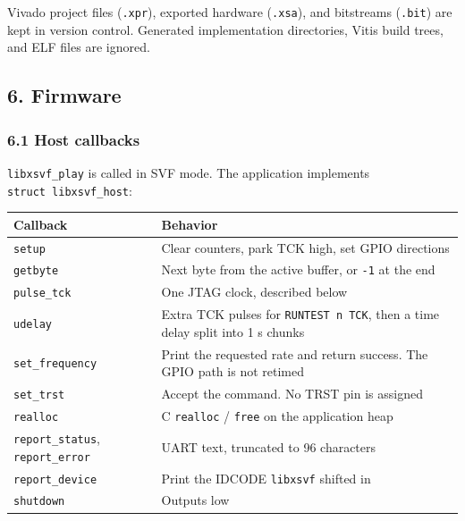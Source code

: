 \documentclass[
  11pt,
  a4paper,
]{article}
\newcounter{none} %
\begin{document}
Vivado project files (\texttt{.xpr}), exported hardware (\texttt{.xsa}),
and bitstreams (\texttt{.bit}) are kept in version control. Generated
implementation directories, Vitis build trees, and ELF files are
ignored.

\subsection{6. Firmware}\label{firmware}

\subsubsection{6.1 Host callbacks}\label{host-callbacks}

\texttt{libxsvf\_play} is called in SVF mode. The application implements
\texttt{struct\ libxsvf\_host}:

{\def\LTcaptype{none} %
\begin{longtable}[]{@{}
  >{\raggedright\arraybackslash}p{}
  >{\raggedright\arraybackslash}p{}@{}}
\toprule\noalign{}
\begin{minipage}[b]{\linewidth}\raggedright
Callback
\end{minipage} & \begin{minipage}[b]{\linewidth}\raggedright
Behavior
\end{minipage} \\
\midrule\noalign{}
\endhead
\bottomrule\noalign{}
\endlastfoot
\texttt{setup} & Clear counters, park TCK high, set GPIO directions \\
\texttt{getbyte} & Next byte from the active buffer, or \texttt{-1} at
the end \\
\texttt{pulse\_tck} & One JTAG clock, described below \\
\texttt{udelay} & Extra TCK pulses for \texttt{RUNTEST\ n\ TCK}, then a
time delay split into 1 s chunks \\
\texttt{set\_frequency} & Print the requested rate and return success.
The GPIO path is not retimed \\
\texttt{set\_trst} & Accept the command. No TRST pin is assigned \\
\texttt{realloc} & C \texttt{realloc} / \texttt{free} on the application
heap \\
\texttt{report\_status}, \texttt{report\_error} & UART text, truncated
to 96 characters \\
\texttt{report\_device} & Print the IDCODE \texttt{libxsvf} shifted
in \\
\texttt{shutdown} & Outputs low \\
\end{longtable}
}
\end{document}
